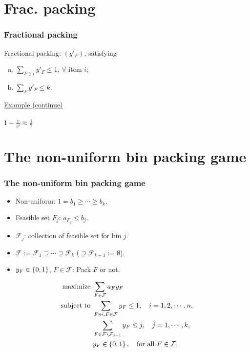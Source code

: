 \documentclass{beamer}
\begin{document}
\section{Frac. packing}

\begin{frame}\frametitle{Fractional packing}
  Fractional packing: $(y'_F)$, satisfying
     \begin{enumerate}[(a)]
        \item $\sum_{F\ni i}{y'_F}\leq 1$, $\forall$ item $i$;
        \item $\sum_{F}y'_F\leq k$.
      \end{enumerate}
      \pause
  \vspace*{10pt}\underline{Example (continue)}
  \\[10pt]
  
  \\[10pt]
  \pause[4]
  \hspace*{197pt}$1-\frac{v}{v'} \approx \frac{1}{7}$
\end{frame}

\section{The non-uniform bin packing game}
\begin{frame}\frametitle{The non-uniform bin packing game}
  \begin{itemize}
    \item Non-uniform: $1=b_1\geq \cdots\geq b_k$.
    \item<2-> Feasible set $F_j$: $a_{F_j}\leq b_j$.
    \item<3-> $\mathcal{F}_j$: collection of feasible set for bin $j$.
    \item<4-> $\mathcal{F}:=\mathcal{F}_1\supseteq \cdots\supseteq\mathcal{F}_k$ ($\supseteq\mathcal{F}_{k+1} :=\emptyset$).
    \item<5-> $y_F\in\left\{0,1\right\}$, $F\in \mathcal{F}$: Pack $F$ or not.
  \end{itemize}
  \pause[6]
  \begin{align*}
    \text{maximize }   & \sum_{F\in\mathcal{F}}a_Fy_F\\
    \text{subject to } & \sum_{F\ni i,F\in\mathcal{F}}y_F\leq 1, \quad i=1,2,\cdots,n,\\
                       & \sum_{F\in \mathcal{F}\backslash \mathcal{F}_{j+1}}y_F \leq j, \quad j = 1,\cdots,k,\\
                       & y_F\in\left\{0,1\right\}, \quad \text{for all } F\in\mathcal{F}.
  \end{align*}
\end{frame}
\end{document}

